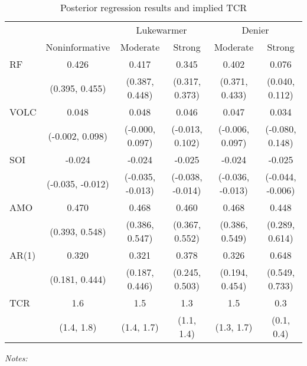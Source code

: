\documentclass[smallextended]{svjour3}       %
\begin{document}
\begin{table}

\caption{\label{tab:regtab}Posterior regression results and implied TCR \label{tab:reg}}
\centering
\fontsize{8}{10}\selectfont
\begin{threeparttable}
\begin{tabular}[t]{lccccc}
\toprule
\multicolumn{2}{c}{ } & \multicolumn{2}{c}{Lukewarmer} & \multicolumn{2}{c}{Denier} \\
\cmidrule(l{3pt}r{3pt}){3-4} \cmidrule(l{3pt}r{3pt}){5-6}
 & Noninformative & Moderate & Strong & Moderate & Strong\\
\midrule
RF & 0.426 & 0.417 & 0.345 & 0.402 & 0.076\\
 & (0.395, 0.455) & (0.387, 0.448) & (0.317, 0.373) & (0.371, 0.433) & (0.040, 0.112)\\
VOLC & 0.048 & 0.048 & 0.046 & 0.047 & 0.034\\
 & (-0.002, 0.098) & (-0.000, 0.097) & (-0.013, 0.102) & (-0.006, 0.097) & (-0.080, 0.148)\\
SOI & -0.024 & -0.024 & -0.025 & -0.024 & -0.025\\
\addlinespace
 & (-0.035, -0.012) & (-0.035, -0.013) & (-0.038, -0.014) & (-0.036, -0.013) & (-0.044, -0.006)\\
AMO & 0.470 & 0.468 & 0.460 & 0.468 & 0.448\\
 & (0.393, 0.548) & (0.386, 0.547) & (0.367, 0.552) & (0.386, 0.549) & (0.289, 0.614)\\
\midrule
AR(1) & 0.320 & 0.321 & 0.378 & 0.326 & 0.648\\
 & (0.181, 0.444) & (0.187, 0.446) & (0.245, 0.503) & (0.194, 0.454) & (0.549, 0.733)\\
\midrule
\addlinespace
TCR & 1.6 & 1.5 & 1.3 & 1.5 & 0.3\\
 & (1.4, 1.8) & (1.4, 1.7) & (1.1, 1.4) & (1.3, 1.7) & (0.1, 0.4)\\
\bottomrule
\end{tabular}
\begin{tablenotes}[para]
\item \textit{Notes:} 

\end{tablenotes}
\end{threeparttable}
\end{table}
\end{document}
